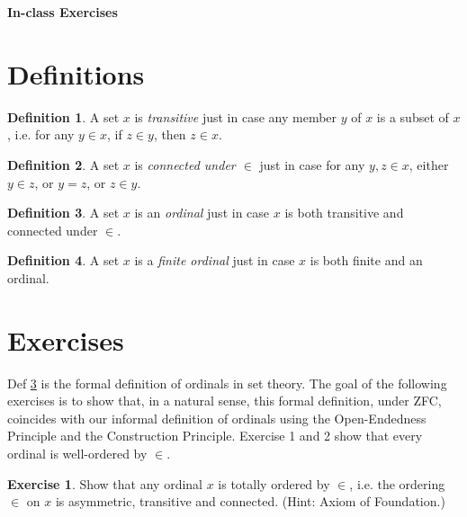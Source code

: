 \documentclass[11pt]{article}
\theoremstyle{definition}
\newtheorem{defn}{Definition}
\newtheorem{exer}{Exercise}
\begin{document}



\begin{center}
{\LARGE \bf In-class Exercises}
\end{center}

\smallskip

\section{Definitions}

\begin{defn}
A set $x$ is \textit{transitive} just in case any member $y$ of $x$ is a subset of $x$, i.e. for any $y \in x$, if $z \in y$, then $z \in x$.
\end{defn}

\begin{defn}
A set $x$ is \textit{connected under $\in$} just in case for any $y, z \in x$, either $y \in z$, or $y = z$, or $z \in y$.
\end{defn}

\begin{defn} \label{Ordinal}
A set $x$ is an \textit{ordinal} just in case $x$ is both transitive and connected under $\in$.
\end{defn}

\begin{defn}
A set $x$ is a \textit{finite ordinal} just in case $x$ is both finite and an ordinal.
\end{defn}

\section{Exercises}

Def \ref{Ordinal} is the formal definition of ordinals in set theory. The goal of the following exercises is to show that, in a natural sense, this formal definition, under ZFC, coincides with our informal definition of ordinals using the Open-Endedness Principle and the Construction Principle. Exercise 1 and 2 show that every ordinal is well-ordered by $\in$. 

\begin{exer}
Show that any ordinal $x$ is totally ordered by $\in$, i.e. the ordering $\in$ on $x$ is asymmetric, transitive and connected. (Hint: Axiom of Foundation.)
\end{exer}
\end{document}
